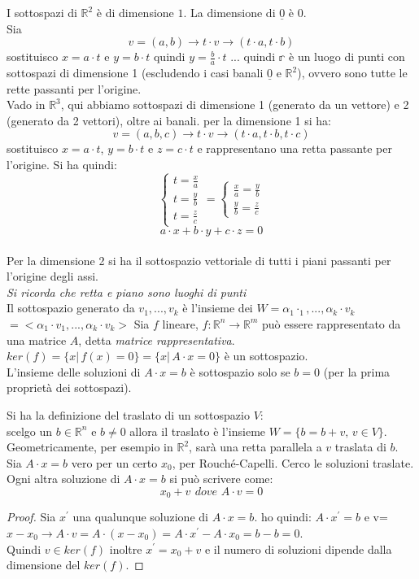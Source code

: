 \documentclass[a4paper,12pt, oneside]{book}
\begin{document}
I sottospazi di $\mathbb{R}^2$ è di dimensione $1$. La dimensione di $\underline{0}$ è $0$.\\
Sia $$v=(a,b)\rightarrow t\cdot v\rightarrow (t\cdot a , t\cdot b)$$ sostituisco $x=a\cdot t$ e $y=b\cdot t$ quindi $y=\frac{b}{a}\cdot t$ ... quindi $\mathbb{r}$ è un luogo di punti con sottospazi di dimensione 1 (escludendo i casi banali $\underline{0}$ e $\mathbb{R}^2$), ovvero sono tutte le rette passanti per l'origine. \\
Vado in $\mathbb{R}^3$, qui abbiamo sottospazi di dimensione 1 (generato da un vettore) e 2 (generato da 2 vettori), oltre ai banali.
per la dimensione 1 si ha:
$$v=(a,b,c)\rightarrow t\cdot v\rightarrow (t\cdot a , t\cdot b, t\cdot c)$$sostituisco $x=a\cdot t$, $y=b\cdot t$ e $z=c\cdot t$ e rappresentano una retta passante per l'origine. Si ha quindi:
$$
	\begin{cases}
		t=\frac{x}{a} \\
		t=\frac{y}{b} \\
		t=\frac{z}{c}
	\end{cases}=
	\begin{cases}
		\frac{x}{a}=\frac{y}{b} \\
		\frac{y}{b}=\frac{z}{c}
	\end{cases}$$
$$a\cdot x+b\cdot y+c\cdot z=0$$\\
Per la dimensione 2 si ha il sottospazio vettoriale di tutti i piani passanti per l'origine degli assi. \\
\textit{Si ricorda che retta e piano sono luoghi di punti}\\
Il sottospazio generato da $v_1,...,v_k$ è l'insieme dei $W=\alpha_1\cdot _1,...,\alpha_k\cdot v_k$\\$=<\alpha_1\cdot v_1,...,\alpha_k\cdot v_k>$
	\newpage
	Sia $f$ lineare, $f:\mathbb{R}^n\rightarrow\mathbb{R}^m$ può essere rappresentato da una matrice $A$, detta \textit{matrice rappresentativa}. $ker(f)=\{x|\,f(x)=0\}=\{x|\,A\cdot x=0\}$ è un sottospazio.\\
	L'insieme delle soluzioni di $A\cdot x=b$ è sottospazio solo se $b=0$ (per la prima proprietà dei sottospazi).\\
	\begin{definizione}
		Si ha la definizione del traslato di un sottospazio $V$:\\
		scelgo un $b\in \mathbb{R}^n$ e $b\neq 0$ allora il traslato è l'insieme $W=\{b=b+v,\,v\in V\}$. Geometricamente, per esempio in $\mathbb{R}^2$, sarà una retta parallela a $v$ traslata di $b$.\\
		Sia $A\cdot x=b$ vero per un certo $x_0$, per Rouché-Capelli. Cerco le soluzioni traslate.
		Ogni altra soluzione di $A\cdot x=b$  si può scrivere come:
		$$x_0+v\,\ dove\,\, A\cdot v =0$$
	\end{definizione}
	\begin{proof}
		Sia $x^{'}$ una qualunque soluzione di $A\cdot x=b$. ho quindi: $A\cdot x^{'}=b$  e v=$x-x_0\rightarrow A\cdot v= A\cdot(x-x_0)=A\cdot x^{'}-A\cdot x_0=b-b=0$.\\
		Quindi $v\in ker(f)$ inoltre $x^{'}=x_0+v$ e il numero di soluzioni dipende dalla dimensione del $ker(f)$.
	\end{proof}
\end{document}
